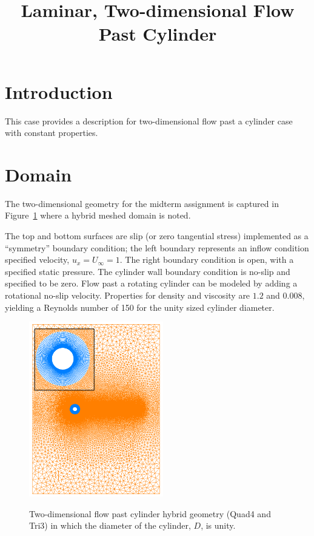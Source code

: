 \documentclass{article}
\title{Laminar, Two-dimensional Flow Past Cylinder}
\date{}
\begin{document}
\maketitle

\section{Introduction}
This case provides a description for two-dimensional flow past a cylinder case
with constant properties.

\section{Domain}
The two-dimensional geometry for the midterm assignment is captured in 
Figure~\ref{fig:geom} where a hybrid meshed domain is noted.

The top and bottom surfaces are slip (or zero tangential stress) implemented as a ``symmetry'' boundary 
condition; the left boundary represents an inflow condition specified velocity, $u_x =  U_\infty = 1$. 
The right boundary condition is open, with a specified static pressure. The cylinder wall boundary condition is 
no-slip and specified to be zero. Flow past a rotating cylinder can be modeled by adding a rotational no-slip 
velocity. Properties for density and viscosity are $1.2$ and $0.008$, yielding a Reynolds number of 150 for the unity
sized cylinder diameter.

\begin{figure}[!htbp]
  \centering
  {
   \includegraphics[height=3.0in]{images/street_geom.png}
  }
  \caption{Two-dimensional flow past cylinder hybrid geometry (Quad4 and Tri3) in which the diameter of the cylinder, $D$, is unity.}
  \label{fig:geom}
\end{figure}
\end{document}
